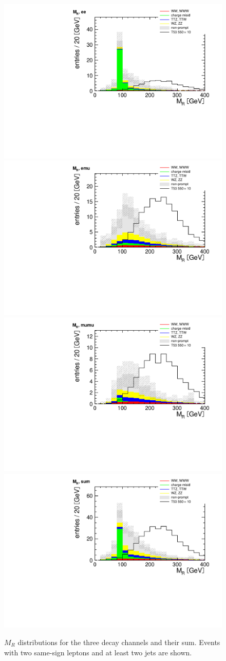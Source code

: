 \begin{figure}[htb]
    \centering
    \includegraphics[width=.7\textwidth]{images/pdf/mr_ee_0}
    \includegraphics[width=.7\textwidth]{images/pdf/mr_emu_0}
    \includegraphics[width=.7\textwidth]{images/pdf/mr_mumu_0}
    \includegraphics[width=.7\textwidth]{images/pdf/mr_sum_0}
    \caption{$M_R$ distributions for the three decay channels and their sum. Events with two same-sign leptons and at least
two jets are shown.}
    \label{fig:mr_nobtag}
\end{figure}

